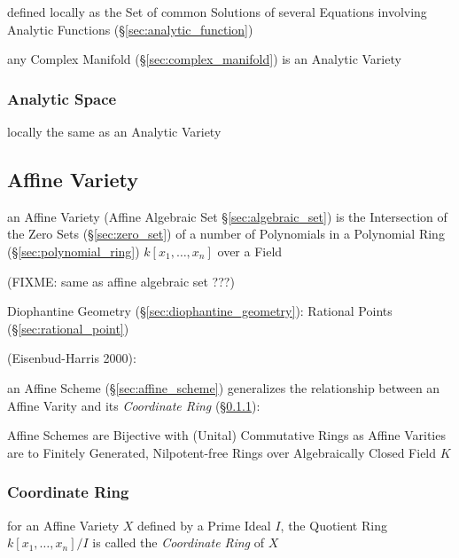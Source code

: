 defined locally as the Set of common Solutions of several Equations involving
Analytic Functions (\S\ref{sec:analytic_function})

any Complex Manifold (\S\ref{sec:complex_manifold}) is an Analytic Variety



\subsubsection{Analytic Space}\label{sec:analytic_space}

locally the same as an Analytic Variety




\subsection{Affine Variety}\label{sec:affine_variety}

an Affine Variety (Affine Algebraic Set \S\ref{sec:algebraic_set}) is the
Intersection of the Zero Sets (\S\ref{sec:zero_set}) of a number of Polynomials
in a Polynomial Ring (\S\ref{sec:polynomial_ring}) $k[x_1,\ldots,x_n]$ over a
Field

(FIXME: same as affine algebraic set ???)

\fist Diophantine Geometry (\S\ref{sec:diophantine_geometry}): Rational Points
(\S\ref{sec:rational_point})

(Eisenbud-Harris 2000):

\fist an Affine Scheme (\S\ref{sec:affine_scheme}) generalizes the relationship
between an Affine Varity and its \emph{Coordinate Ring}
(\S\ref{sec:coordinate_ring}):

Affine Schemes are Bijective with (Unital) Commutative Rings as Affine Varities
are to Finitely Generated, Nilpotent-free Rings over Algebraically Closed Field
$K$



\subsubsection{Coordinate Ring}\label{sec:coordinate_ring}

for an Affine Variety $X$ defined by a Prime Ideal $I$, the Quotient Ring
$k[x_1,\ldots,x_n]/I$ is called the \emph{Coordinate Ring} of $X$



